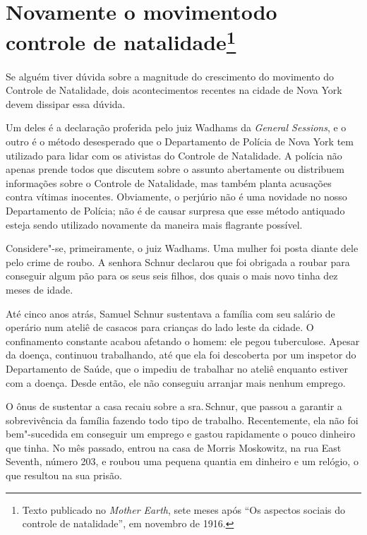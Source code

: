 \chapter[Novamente o movimento do controle de natalidade]{Novamente o movimento\break do controle de natalidade\footnote[*]{Texto publicado
  no \emph{Mother Earth}, sete meses após ``Os aspectos sociais do
  controle de natalidade'', em novembro de 1916.}}

Se alguém tiver dúvida sobre a magnitude do crescimento do movimento do
Controle de Natalidade, dois acontecimentos recentes na cidade de Nova
York devem dissipar essa dúvida.

Um deles é a declaração proferida pelo juiz Wadhams da \emph{General
Sessions}, e o outro é o método desesperado que o Departamento de
Polícia de Nova York tem utilizado para lidar com os ativistas do
Controle de Natalidade. A polícia não apenas prende todos que discutem
sobre o assunto abertamente ou distribuem informações sobre o Controle
de Natalidade, mas também planta acusações contra vítimas inocentes.
Obviamente, o perjúrio não é uma novidade no nosso Departamento de
Polícia; não é de causar surpresa que esse método antiquado esteja sendo
utilizado novamente da maneira mais flagrante possível.

Considere"-se, primeiramente, o juiz Wadhams. Uma mulher foi posta diante
dele pelo crime de roubo. A senhora Schnur declarou que foi obrigada a
roubar para conseguir algum pão para os seus seis filhos, dos quais o
mais novo tinha dez meses de idade.

Até cinco anos atrás, Samuel Schnur sustentava a família com seu
salário de operário num ateliê de casacos para crianças do lado leste da
cidade. O confinamento constante acabou afetando o homem: ele pegou
tuberculose. Apesar da doença, continuou trabalhando, até que ela foi
descoberta por um inspetor do Departamento de Saúde, que o impediu de
trabalhar no ateliê enquanto estiver com a doença. Desde então, ele não
conseguiu arranjar mais nenhum emprego.

O ônus de sustentar a casa recaiu sobre a sra.\,Schnur, que passou a
garantir a sobrevivência da família fazendo todo tipo de trabalho.
Recentemente, ela não foi bem"-sucedida em conseguir um emprego e gastou
rapidamente o pouco dinheiro que tinha. No mês passado, entrou na casa
de Morris Moskowitz, na rua East Seventh, número 203, e roubou uma
pequena quantia em dinheiro e um relógio, o que resultou na sua prisão.

